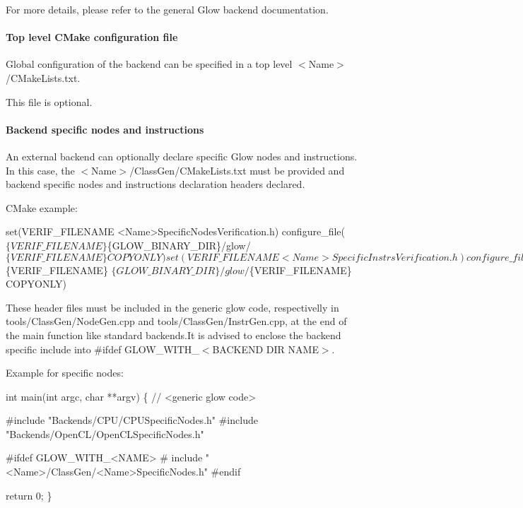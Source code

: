 For more details, please refer to the general Glow backend documentation.

\paragraph*{Top level C\+Make configuration file}

Global configuration of the backend can be specified in a top level {\ttfamily $<$Name$>$/\+C\+Make\+Lists.txt}.

This file is optional.

\paragraph*{Backend specific nodes and instructions}

An external backend can optionally declare specific Glow nodes and instructions. In this case, the {\ttfamily $<$Name$>$/\+Class\+Gen/\+C\+Make\+Lists.txt} must be provided and backend specific nodes and instructions declaration headers declared.

C\+Make example\+: 
\begin{DoxyCode}
set(VERIF\_FILENAME <Name>SpecificNodesVerification.h)
configure\_file($\{VERIF\_FILENAME\}
               $\{GLOW\_BINARY\_DIR\}/glow/$\{VERIF\_FILENAME\} COPYONLY)

set(VERIF\_FILENAME <Name>SpecificInstrsVerification.h)
configure\_file($\{VERIF\_FILENAME\}
               $\{GLOW\_BINARY\_DIR\}/glow/$\{VERIF\_FILENAME\} COPYONLY)
\end{DoxyCode}


These header files must be included in the generic glow code, respectivelly in {\ttfamily tools/\+Class\+Gen/\+Node\+Gen.\+cpp} and {\ttfamily tools/\+Class\+Gen/\+Instr\+Gen.\+cpp}, at the end of the {\ttfamily main} function like standard backends.\+It is advised to enclose the backend specific include into {\ttfamily \#ifdef G\+L\+O\+W\+\_\+\+W\+I\+T\+H\+\_\+$<$B\+A\+C\+K\+E\+ND D\+IR N\+A\+ME$>$}.

Example for specific nodes\+: 
\begin{DoxyCode}
int main(int argc, char **argv) \{
  // <generic glow code>

#include "Backends/CPU/CPUSpecificNodes.h"
#include "Backends/OpenCL/OpenCLSpecificNodes.h"

#ifdef GLOW\_WITH\_<NAME>
# include "<Name>/ClassGen/<Name>SpecificNodes.h"
#endif

  return 0;
\}
\end{DoxyCode}


